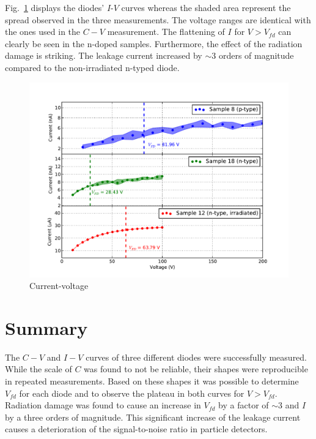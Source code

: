 \documentclass[11pt]{article}
\begin{document}
Fig.~\ref{fig:iv} displays the diodes' $I$-$V$ curves whereas the shaded area represent the spread observed in the three measurements.
The voltage ranges are identical with the ones used in the $C-V$ measurement.
The flattening of $I$ for $V>V_{fd}$ can clearly be seen in the n-doped samples.
Furthermore, the effect of the radiation damage is striking.
The leakage current increased by $\sim 3$ orders of magnitude compared to the non-irradiated n-typed diode.

\begin{figure}
  \centering
  \includegraphics[width=\textwidth]{./figures/iv.pdf}
  \caption{Current-voltage}
  \label{fig:iv}
\end{figure}

\section{Summary}
\label{sec:summary}
The $C-V$ and $I-V$ curves of three different diodes were successfully measured.
While the scale of $C$ was found to not be reliable, their shapes were reproducible in repeated measurements.
Based on these shapes it was possible to determine $V_{fd}$ for each diode and to observe the plateau in both curves for $V>V_{fd}$.
Radiation damage was found to cause an increase in $V_{fd}$ by a factor of $\sim 3$ and  $I$ by a three orders of magnitude.
This significant increase of the leakage current causes a deterioration of the signal-to-noise ratio in particle detectors.


\printbibliography
\end{document}
